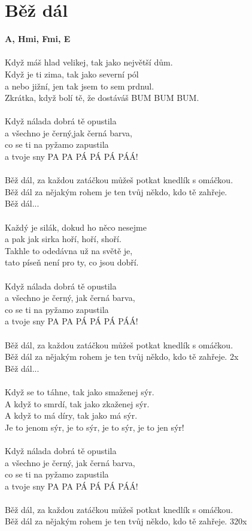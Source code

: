 \section{Běž dál}
\footnotesize\textbf{A, Hmi, F\kr mi, E\7}\\
\normalsize
\\
Když máš hlad velikej, tak jako největší dům.\\
Když je ti zima, tak jako severní pól\\
a nebo jižní, jen tak jsem to sem prdnul.\\
Zkrátka, když bolí tě, že dostáváš BUM BUM BUM.\\
\\
Když nálada dobrá tě opustila\\
a všechno je černý,jak černá barva,\\
co se ti na pyžamo zapustila\\
a tvoje sny PA PA PÁ PÁ PÁ PÁÁ!\\
\\
Běž dál, za každou zatáčkou můžeš potkat knedlík s omáčkou.\\
Běž dál za nějakým rohem je ten tvůj někdo, kdo tě zahřeje.\\
Běž dál...\\
\\
Každý je silák, dokud ho něco nesejme\\
a pak jak sirka hoří, hoří, shoří.\\
Takhle to odedávna už na světě je,\\
tato píseň není pro ty, co jsou dobří.\\
\\
Když nálada dobrá tě opustila\\
a všechno je černý, jak černá barva,\\
co se ti na pyžamo zapustila\\
a tvoje sny PA PA PÁ PÁ PÁ PÁÁ!\\
\\
Běž dál, za každou zatáčkou můžeš potkat knedlík s omáčkou.\\
Běž dál za nějakým rohem je ten tvůj někdo, kdo tě zahřeje. 2x\\
Běž dál...\\
\\
Když se to táhne, tak jako smaženej sýr.\\
A když to smrdí, tak jako zkaženej sýr.\\
A když to má díry, tak jako má sýr.\\
Je to jenom sýr, je to sýr, je to sýr, je to jen sýr!\\
\\
Když nálada dobrá tě opustila\\
a všechno je černý, jak černá barva,\\
co se ti na pyžamo zapustila\\
a tvoje sny PA PA PÁ PÁ PÁ PÁÁ!\\
\\
Běž dál, za každou zatáčkou můžeš potkat knedlík s omáčkou.\\
Běž dál za nějakým rohem je ten tvůj někdo, kdo tě zahřeje. 320x
